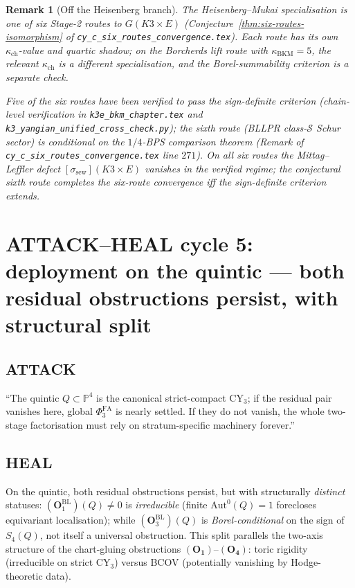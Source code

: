 \documentclass[11pt]{amsart}
\newtheorem{remark}[theorem]{Remark}
\newcommand{\kch}{\kappa_{\mathrm{ch}}}
\newcommand{\kBKM}{\kappa_{\mathrm{BKM}}}
\newcommand{\bP}{\mathbb{P}}
\newcommand{\Aut}{\mathrm{Aut}}
\newcommand{\PhiFA}{\Phi^{\mathrm{FA}}}
\begin{document}
\begin{remark}[Off the Heisenberg branch]
The Heisenberg--Mukai specialisation is one of six Stage-2 routes to
$G(K3 \times E)$ (Conjecture~\ref{thm:six-routes-isomorphism} of
\texttt{cy\_c\_six\_routes\_convergence.tex}). Each route has its
own $\kch$-value and quartic shadow; on the Borcherds lift route
with $\kBKM = 5$, the relevant $\kch$ is a different specialisation,
and the Borel-summability criterion is a separate check.

Five of the six routes have been verified to pass the sign-definite
criterion (chain-level verification in \texttt{k3e\_bkm\_chapter.tex}
and \texttt{k3\_yangian\_unified\_cross\_check.py}); the sixth route
(BLLPR class-$\mathcal{S}$ Schur sector) is conditional on the
$1/4$-BPS comparison theorem (Remark of
\texttt{cy\_c\_six\_routes\_convergence.tex}
line $271$). On all six routes the Mittag--Leffler defect
$[\sigma_{\mathrm{sew}}](K3 \times E)$ vanishes in the verified
regime; the conjectural sixth route completes the six-route
convergence iff the sign-definite criterion extends.
\end{remark}

\section{ATTACK--HEAL cycle 5: deployment on the quintic ---
both residual obstructions persist, with structural split}
\label{sec:cycle-5-quintic}

\subsection*{ATTACK}

``The quintic $Q \subset \bP^4$ is the canonical strict-compact
CY$_3$; if the residual pair vanishes here, global $\PhiFA_3$ is
nearly settled. If they do not vanish, the whole two-stage
factorisation must rely on stratum-specific machinery forever.''

\subsection*{HEAL}

On the quintic, both residual obstructions persist, but with
structurally \emph{distinct} statuses:
$(\mathbf{O}_1^{\mathrm{BL}})(Q) \neq 0$ is \emph{irreducible}
(finite $\Aut^0(Q) = 1$ forecloses equivariant localisation); while
$(\mathbf{O}_3^{\mathrm{BL}})(Q)$ is \emph{Borel-conditional} on
the sign of $S_4(Q)$, not itself a universal obstruction. This
split parallels the two-axis structure of the chart-gluing
obstructions $(\mathbf{O_1})$--$(\mathbf{O_4})$: toric rigidity
(irreducible on strict CY$_3$) versus BCOV (potentially vanishing
by Hodge-theoretic data).
\end{document}
